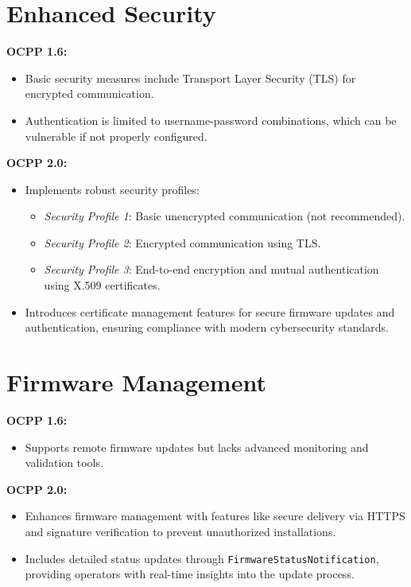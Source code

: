\documentclass[12pt,a4paper]{report}
\begin{document}
\section{Enhanced Security}

\textbf{OCPP 1.6:}
\begin{itemize}
  \item Basic security measures include Transport Layer Security (TLS) for encrypted
        communication.
  \item Authentication is limited to username-password combinations, which can be vulnerable
        if not properly configured.
\end{itemize}

\textbf{OCPP 2.0:}
\begin{itemize}
  \item Implements robust security profiles:
        \begin{itemize}
          \item \textit{Security Profile 1}: Basic unencrypted communication (not recommended).
          \item \textit{Security Profile 2}: Encrypted communication using TLS.
          \item \textit{Security Profile 3}: End-to-end encryption and mutual authentication
                using X.509 certificates.
        \end{itemize}
  \item Introduces certificate management features for secure firmware updates and
        authentication, ensuring compliance with modern cybersecurity standards.
\end{itemize}

\section{Firmware Management}

\textbf{OCPP 1.6:}
\begin{itemize}
  \item Supports remote firmware updates but lacks advanced monitoring and validation tools.
\end{itemize}

\textbf{OCPP 2.0:}
\begin{itemize}
  \item Enhances firmware management with features like secure delivery via HTTPS and
        signature verification to prevent unauthorized installations.
  \item Includes detailed status updates through \texttt{FirmwareStatusNotification},
        providing operators with real-time insights into the update process.
\end{itemize}
\end{document}

